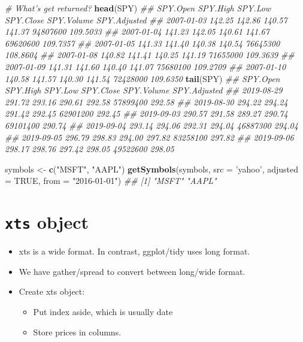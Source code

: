 \documentclass[]{article}
\newenvironment{Shaded}{\begin{snugshade}}{\end{snugshade}}
\newcommand{\CommentTok}[1]{\textcolor[rgb]{0.56,0.35,0.01}{\textit{#1}}}
\newcommand{\DataTypeTok}[1]{\textcolor[rgb]{0.13,0.29,0.53}{#1}}
\newcommand{\KeywordTok}[1]{\textcolor[rgb]{0.13,0.29,0.53}{\textbf{#1}}}
\newcommand{\NormalTok}[1]{#1}
\newcommand{\OtherTok}[1]{\textcolor[rgb]{0.56,0.35,0.01}{#1}}
\newcommand{\StringTok}[1]{\textcolor[rgb]{0.31,0.60,0.02}{#1}}
\providecommand{\tightlist}{%
  \setlength{\itemsep}{0pt}\setlength{\parskip}{0pt}}
\begin{document}
\begin{Shaded}
\begin{Highlighting}[]
\CommentTok{# What's get returned?}
\KeywordTok{head}\NormalTok{(SPY)}
\CommentTok{##            SPY.Open SPY.High SPY.Low SPY.Close SPY.Volume SPY.Adjusted}
\CommentTok{## 2007-01-03   142.25   142.86  140.57    141.37   94807600     109.5033}
\CommentTok{## 2007-01-04   141.23   142.05  140.61    141.67   69620600     109.7357}
\CommentTok{## 2007-01-05   141.33   141.40  140.38    140.54   76645300     108.8604}
\CommentTok{## 2007-01-08   140.82   141.41  140.25    141.19   71655000     109.3639}
\CommentTok{## 2007-01-09   141.31   141.60  140.40    141.07   75680100     109.2709}
\CommentTok{## 2007-01-10   140.58   141.57  140.30    141.54   72428000     109.6350}
\KeywordTok{tail}\NormalTok{(SPY)}
\CommentTok{##            SPY.Open SPY.High SPY.Low SPY.Close SPY.Volume SPY.Adjusted}
\CommentTok{## 2019-08-29   291.72   293.16  290.61    292.58   57899400       292.58}
\CommentTok{## 2019-08-30   294.22   294.24  291.42    292.45   62901200       292.45}
\CommentTok{## 2019-09-03   290.57   291.58  289.27    290.74   69101400       290.74}
\CommentTok{## 2019-09-04   293.14   294.06  292.31    294.04   46887300       294.04}
\CommentTok{## 2019-09-05   296.79   298.83  294.00    297.82   83258100       297.82}
\CommentTok{## 2019-09-06   298.17   298.76  297.42    298.05   49522600       298.05}

\NormalTok{symbols <-}\StringTok{ }\KeywordTok{c}\NormalTok{(}\StringTok{"MSFT"}\NormalTok{, }\StringTok{"AAPL"}\NormalTok{)}
\KeywordTok{getSymbols}\NormalTok{(symbols, }\DataTypeTok{src =} \StringTok{'yahoo'}\NormalTok{, }\DataTypeTok{adjusted =} \OtherTok{TRUE}\NormalTok{, }\DataTypeTok{from =} \StringTok{"2016-01-01"}\NormalTok{)}
\CommentTok{## [1] "MSFT" "AAPL"}
\end{Highlighting}
\end{Shaded}

\hypertarget{xts-object}{%
\section{\texorpdfstring{\texttt{xts}
object}{xts object}}\label{xts-object}}

\begin{itemize}
\tightlist
\item
  xts is a wide format. In contrast, ggplot/tidy uses long format.
\item
  We have gather/spread to convert between long/wide format.
\item
  Create xts object:

  \begin{itemize}
  \tightlist
  \item
    Put index aside, which is usually date
  \item
    Store prices in columns.
  \end{itemize}
\end{itemize}
\end{document}
